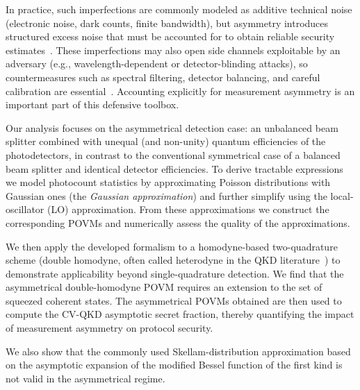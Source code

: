 \documentclass[%
reprint,
superscriptaddress,
 amsmath,amssymb,amsfonts,
 aps,
 pra,
 longbibliography
]{revtex4-2}
\begin{document}
In practice, such imperfections are commonly modeled as additive technical noise (electronic noise, dark counts, finite bandwidth), but asymmetry introduces structured excess noise that must be accounted for to obtain reliable security estimates~\cite{Wang:23,ruiz2023effects,usenko2016trusted}. These imperfections may also open side channels exploitable by an adversary (e.g., wavelength-dependent or detector-blinding attacks), so countermeasures such as spectral filtering, detector balancing, and careful calibration are essential~\cite{huang2012wavelength,huang2014quantum,qin2018homodyne,qin2016quantum,Wang:23}. Accounting explicitly for measurement asymmetry is an important part of this defensive toolbox.


Our analysis focuses on the asymmetrical detection case: an unbalanced beam splitter combined with unequal (and non-unity) quantum efficiencies of the photodetectors, in contrast to the conventional symmetrical case of a balanced beam splitter and identical detector efficiencies. To derive tractable expressions we model photocount statistics by approximating Poisson distributions with Gaussian ones (the \emph{Gaussian approximation}) and further simplify using the local-oscillator (LO) approximation. From these approximations we construct the corresponding POVMs and numerically assess the quality of the approximations.

We then apply the developed formalism to a homodyne-based two-quadrature scheme (double homodyne, often called heterodyne in the QKD literature~\cite{Pirandola:20,opt3040030,Zhang:apr:2024}) to demonstrate applicability beyond single-quadrature detection. We find that the asymmetrical double-homodyne POVM requires an extension to the set of squeezed coherent states. The asymmetrical POVMs obtained are then used to compute the CV-QKD asymptotic secret fraction, thereby quantifying the impact of measurement asymmetry on protocol security.

We also show that the commonly used Skellam-distribution approximation based on the asymptotic expansion of the modified Bessel function of the first kind is not valid in the asymmetrical regime.
\end{document}
